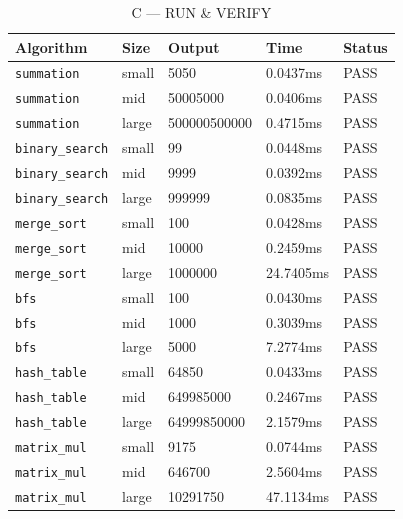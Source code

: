 \begin{table}[h]
    \centering
    \caption{C --- RUN \& VERIFY}\label{tab:c_run_verify}
    \small
    \begin{tabular}{lllll}
        \hline
        \textbf{Algorithm} & \textbf{Size} & \textbf{Output} & \textbf{Time} & \textbf{Status} \\
        \hline
            \texttt{summation}          & small    & 5050             &  0.0437ms  & PASS \\
            \texttt{summation}          & mid      & 50005000         &  0.0406ms  & PASS \\
            \texttt{summation}          & large    & 500000500000     &  0.4715ms  & PASS \\
            \texttt{binary\_search}     & small    & 99               &  0.0448ms  & PASS \\
            \texttt{binary\_search}     & mid      & 9999             &  0.0392ms  & PASS \\
            \texttt{binary\_search}     & large    & 999999           &  0.0835ms  & PASS \\
            \texttt{merge\_sort}        & small    & 100              &  0.0428ms  & PASS \\
            \texttt{merge\_sort}        & mid      & 10000            &  0.2459ms  & PASS \\
            \texttt{merge\_sort}        & large    & 1000000          & 24.7405ms  & PASS \\
            \texttt{bfs}                & small    & 100              &  0.0430ms  & PASS \\
            \texttt{bfs}                & mid      & 1000             &  0.3039ms  & PASS \\
            \texttt{bfs}                & large    & 5000             &  7.2774ms  & PASS \\
            \texttt{hash\_table}        & small    & 64850            &  0.0433ms  & PASS \\
            \texttt{hash\_table}        & mid      & 649985000        &  0.2467ms  & PASS \\
            \texttt{hash\_table}        & large    & 64999850000      &  2.1579ms  & PASS \\
            \texttt{matrix\_mul}        & small    & 9175             &  0.0744ms  & PASS \\
            \texttt{matrix\_mul}        & mid      & 646700           &  2.5604ms  & PASS \\
            \texttt{matrix\_mul}        & large    & 10291750         & 47.1134ms  & PASS \\
        \hline
    \end{tabular}
\end{table}

